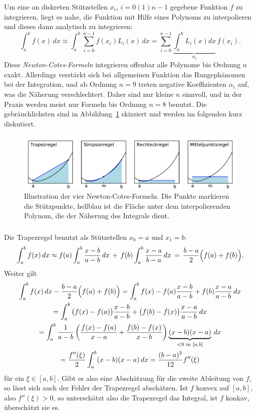 Um eine an diskreten Stützstellen $x_i$, $i=0(1)n-1$ gegebene Funktion
$f$ zu integrieren, liegt es nahe, die Funktion mit Hilfe eines
Polynoms zu interpolieren und dieses dann analytisch zu integrieren:
\begin{equation}
  \int_a^b f(x)\, dx \approx
  \int_a^b \sum_{i=0}^{n-1} f(x_i) L_i(x) \, dx = \sum_{i=0}^{n-1}
  \underbrace{\int_a^b
  L_i(x) dx}_{\alpha_i}\, f(x_i).
\end{equation}
Diese \emph{Newton-Cotes-Formeln} integrieren offenbar alle Polynome
bis Ordnung $n$ exakt. Allerdings verstärkt sich bei allgemeinen
Funktion das Rungephänomen bei der Integration, und ab Ordnung $n=9$
treten negative Koeffizienten $\alpha_i$ auf, was die Näherung
verschlechtert. Daher sind nur kleine $n$ sinnvoll, und in der Praxis
werden meist nur Formeln bis Ordnung $n=8$ benutzt. Die
gebräuchlichsten sind in Abbildung~\ref{fig:intregel} skizziert und
werden im folgenden kurz diskutiert.

\begin{figure}
  \centering
  \includegraphics[width=\textwidth]{plots/num_int}
  \caption{Illustration der vier Newton-Cotes-Formeln. Die Punkte
    markieren die Stützpunkte, hellblau ist die Fläche unter dem
    interpolierenden Polynom, die der Näherung des Integrals dient.}
  \label{fig:intregel}
\end{figure}
\subsubsection{}

Die Trapezregel benutzt als Stützstellen $x_0=a$ und $x_1=b$:
\begin{equation}
  \int_a^b f(x)\, dx \approx f(a)\int_a^b \frac{x-b}{a-b}\,dx \,+\,
  f(b)\int_a^b \frac{x-a}{b-a}\,dx
  \,=\, \frac{b-a}{2} \Bigl(f(a) + f(b)\Bigr).
\end{equation}
Weiter gilt
\begin{multline}
  \int_a^b f(x)\, dx - \frac{b-a}{2} \Bigl(f(a) + f(b)\Bigr)
  =  \int_a^b f(x) - f(a)\frac{x-b}{a-b}
  + f(b)\frac{x-a}{a-b}\, dx\\
  =  \int_a^b
  {}\bigl(f(x) - f(a)\bigr)\frac{x-b}{a-b}
  + \bigl(f(b) - f(x)\bigr)\frac{x-a}{a-b}\, dx\\
  =  \int_a^b
  \frac{1}{a-b}\left(\frac{f(x) - f(a)}{x-a} + \frac{f(b) - f(x)}{x-b}\right)
  \underbrace{(x-b)(x-a)}_{<0 \text{ in } [a,b]}\, dx\\
  =
  \frac{f''(\xi)}{2}\int_a^b (x-b)(x-a)\, dx = \frac{(b-a)^3}{12} f''(\xi)
\end{multline}
für ein $\xi\in[a,b]$. Gibt es also eine Abschätzung für die zweite
Ableitung von $f$, so lässt sich auch der Fehler der Trapezregel
abschätzen. Ist $f$ konvex auf $[a,b]$, also $f''(\xi)>0$, so
unterschätzt also die Trapezregel das Integral, ist $f$ konkav,
überschätzt sie es.

